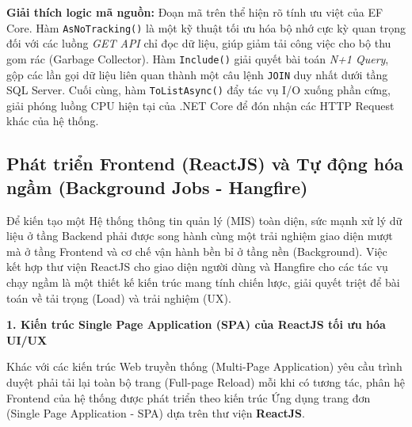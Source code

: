 \documentclass[a4paper,13.5pt]{extreport}
\begin{document}
\textbf{Giải thích logic mã nguồn:} 
Đoạn mã trên thể hiện rõ tính ưu việt của EF Core. Hàm \texttt{AsNoTracking()} là một kỹ thuật tối ưu hóa bộ nhớ cực kỳ quan trọng đối với các luồng \textit{GET API} chỉ đọc dữ liệu, giúp giảm tải công việc cho bộ thu gom rác (Garbage Collector). Hàm \texttt{Include()} giải quyết bài toán \textit{N+1 Query}, gộp các lần gọi dữ liệu liên quan thành một câu lệnh \texttt{JOIN} duy nhất dưới tầng SQL Server. Cuối cùng, hàm \texttt{ToListAsync()} đẩy tác vụ I/O xuống phần cứng, giải phóng luồng CPU hiện tại của .NET Core để đón nhận các HTTP Request khác của hệ thống.
\subsection{Phát triển Frontend (ReactJS) và Tự động hóa ngầm (Background Jobs - Hangfire)}

Để kiến tạo một Hệ thống thông tin quản lý (MIS) toàn diện, sức mạnh xử lý dữ liệu ở tầng Backend phải được song hành cùng một trải nghiệm giao diện mượt mà ở tầng Frontend và cơ chế vận hành bền bỉ ở tầng nền (Background). Việc kết hợp thư viện ReactJS cho giao diện người dùng và Hangfire cho các tác vụ chạy ngầm là một thiết kế kiến trúc mang tính chiến lược, giải quyết triệt để bài toán về tải trọng (Load) và trải nghiệm (UX).

\textbf{1. Kiến trúc Single Page Application (SPA) của ReactJS tối ưu hóa UI/UX}

Khác với các kiến trúc Web truyền thống (Multi-Page Application) yêu cầu trình duyệt phải tải lại toàn bộ trang (Full-page Reload) mỗi khi có tương tác, phân hệ Frontend của hệ thống được phát triển theo kiến trúc Ứng dụng trang đơn (Single Page Application - SPA) dựa trên thư viện \textbf{ReactJS}. 
\end{document}
